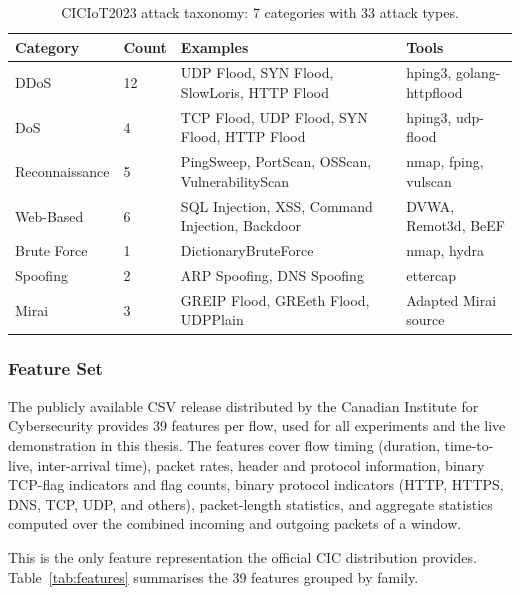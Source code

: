 \begin{table}[htbp]
\begin{center}
\begin{tabular}{|p{80pt}|p{30pt}|p{110pt}|p{90pt}|}
\hline
\textbf{Category} & \textbf{Count} & \textbf{Examples} & \textbf{Tools} \\
\hline
\hline DDoS & 12 & UDP Flood, SYN Flood, SlowLoris, HTTP Flood & hping3, golang-httpflood \\
\hline DoS & 4 & TCP Flood, UDP Flood, SYN Flood, HTTP Flood & hping3, udp-flood \\
\hline Reconnaissance & 5 & PingSweep, PortScan, OSScan, VulnerabilityScan & nmap, fping, vulscan \\
\hline Web-Based & 6 & SQL Injection, XSS, Command Injection, Backdoor & DVWA, Remot3d, BeEF \\
\hline Brute Force & 1 & DictionaryBruteForce & nmap, hydra \\
\hline Spoofing & 2 & ARP Spoofing, DNS Spoofing & ettercap \\
\hline Mirai & 3 & GREIP Flood, GREeth Flood, UDPPlain & Adapted Mirai source \\
\hline
\end{tabular}
\end{center}
\caption{CICIoT2023 attack taxonomy: 7 categories with 33 attack types.}
\label{tab:attack_taxonomy}
\end{table}

\subsubsection{Feature Set}
\label{subsec:features}

\par The publicly available CSV release distributed by the Canadian Institute for Cybersecurity provides 39 features per flow, used for all experiments and the live demonstration in this thesis. The features cover flow timing (duration, time-to-live, inter-arrival time), packet rates, header and protocol information, binary TCP-flag indicators and flag counts, binary protocol indicators (HTTP, HTTPS, DNS, TCP, UDP, and others), packet-length statistics, and aggregate statistics computed over the combined incoming and outgoing packets of a window.

\par This is the only feature representation the official CIC distribution provides. Table~\ref{tab:features} summarises the 39 features grouped by family.

